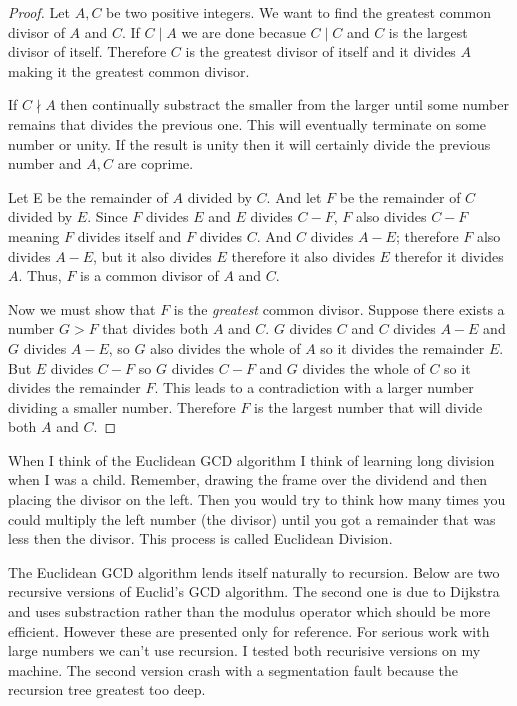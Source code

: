 \begin{proof}
Let $A, C$ be two positive integers. We want to find the greatest common divisor of $A$ and $C$.
If $C \mid A$ we are done becasue $C \mid C$ and $C$ is the largest divisor of itself.
Therefore $C$ is the greatest divisor of itself and it divides $A$ making it the greatest common
divisor.

If $C \nmid A$ then continually substract the smaller from the larger until some number remains
that divides the previous one. This will eventually terminate on some number or unity. If the result is
unity then it will certainly divide the previous number and $A, C$ are coprime.

Let  E be the remainder of $A$ divided by $C$. And let $F$ be the remainder of $C$ divided by $E$. Since $F$
divides $E$ and $E$ divides $C - F$, $F$ also divides $C - F$ meaning $F$ divides itself and $F$ divides $C$.
And $C$ divides $A - E$; therefore $F$ also divides $A - E$, but it also divides $E$ therefore it also
divides $E$ therefor it divides $A$. Thus, $F$ is a common divisor of $A$ and $C$.

Now we must show that $F$ is the \textit{greatest} common divisor. Suppose there exists a number $G > F$ that
divides both $A$ and $C$. $G$ divides $C$ and $C$ divides $A - E$ and $G$ divides $A - E$, so $G$ also divides
the whole of $A$ so it divides the remainder $E$. But $E$ divides $C - F$ so $G$ divides $C - F$ and $G$ divides
the whole of $C$ so it divides the remainder $F$. This leads to a contradiction with a larger number dividing
a smaller number. Therefore $F$ is the largest number that will divide both $A$ and $C$.
\end{proof}

When I think of the Euclidean GCD algorithm I think of learning long division when I was a child. Remember, drawing
the frame over the dividend and then placing the divisor on the left. Then you would try to think how many times
you could multiply the left number (the divisor) until you got a remainder that was less then the divisor. This
process is called Euclidean Division.

The Euclidean GCD algorithm lends itself naturally to recursion. Below are two recursive versions of Euclid's GCD algorithm.
The second one is due to Dijkstra and uses substraction rather than the modulus operator which should be more efficient.
However these are presented only for reference. For serious work with large numbers we can't use recursion. I tested both 
recurisive versions on my machine. The second version crash with a segmentation fault because the recursion tree greatest
too deep.

